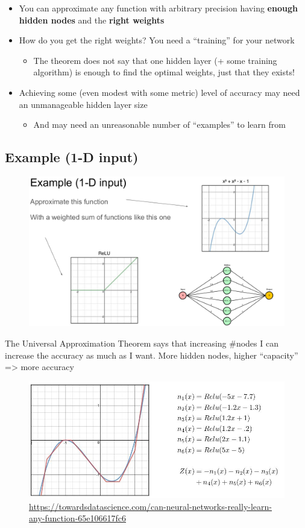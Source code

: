 \begin{itemize}
	\item You can approximate any function with arbitrary precision having \textbf{enough hidden nodes} and the \textbf{right weights}
	\item How do you get the right weights? You need a “training” for your network
	\begin{itemize}
		\item The theorem does not say that one hidden layer (+ some training algorithm) is enough to find the optimal weights, just that they exists!
	\end{itemize}
	\item Achieving some (even modest with some metric) level of accuracy may need an unmanageable hidden layer size
	\begin{itemize}
		\item And may need an unreasonable number of “examples” to learn from
	\end{itemize}
\end{itemize}

\subsection{Example (1-D input)}

\begin{figure}[ht]
	\centering
	\includegraphics[width=0.9\linewidth]{figure_ml/example1d.png}
\end{figure}
\FloatBarrier

The Universal Approximation Theorem says that increasing \#nodes I can
increase the accuracy as much as I want. More hidden nodes, higher “capacity” => more accuracy

\begin{figure}[ht]
	\centering
	\includegraphics[width=0.7\linewidth]{figure_ml/example1d2.png}
	\caption{\url{https://towardsdatascience.com/can-neural-networks-really-learn-any-function-65e106617fc6}}
\end{figure}
\FloatBarrier

